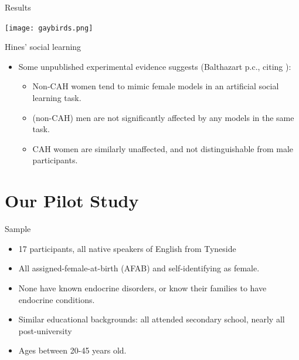 \documentclass[hyperref={pdfpagelabels=false}]{beamer}
\begin{document}
\begin{frame}{\citet{mansukhanietal1996}}
\begin{block}{Results}
\begin{center}
	\texttt{[image: gaybirds.png]}
	\end{center}
\end{block}
\end{frame}


\begin{frame}{Hines' social learning}
\begin{itemize}
	\item Some unpublished experimental evidence suggests (Balthazart p.c., citing \citealt{hines2012}):
		\begin{itemize}
			\item Non-CAH women tend to mimic female models in an artificial social learning task.
			\item (non-CAH) men are not significantly affected by any models in the same task.
			\item CAH women are similarly unaffected, and not distinguishable from male participants.
		\end{itemize}
\end{itemize}

\end{frame}


\section{Our Pilot Study}

\begin{frame}{Sample}
\begin{itemize}
	\item 17 participants, all native speakers of English from Tyneside
	\item All assigned-female-at-birth (AFAB) and self-identifying as female.
	\item None have known endocrine disorders, or know their families to have endocrine conditions.
	\item Similar educational backgrounds: all attended secondary school, nearly all post-university
	\item Ages between 20-45 years old.
	
\end{itemize}
\end{frame}
\end{document}
